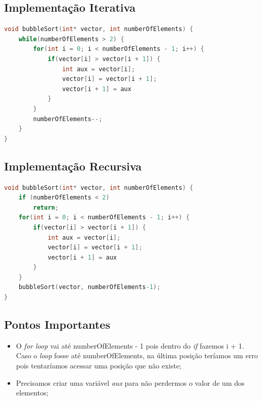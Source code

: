 \subsection{Implementação Iterativa}
\begin{lstlisting}[language=C]
void bubbleSort(int* vector, int numberOfElements) {
    while(numberOfElements > 2) {
        for(int i = 0; i < numberOfElements - 1; i++) {
            if(vector[i] > vector[i + 1]) {
                int aux = vector[i];
                vector[i] = vector[i + 1];
                vector[i + 1] = aux
            }
        }
        numberOfElements--;
    }
}
\end{lstlisting}

\subsection{Implementação Recursiva}
\begin{lstlisting}[language=C]
void bubbleSort(int* vector, int numberOfElements) {
    if (numberOfElements < 2)
        return;
    for(int i = 0; i < numberOfElements - 1; i++) {
        if(vector[i] > vector[i + 1]) {
            int aux = vector[i];
            vector[i] = vector[i + 1];
            vector[i + 1] = aux
        }
    }
    bubbleSort(vector, numberOfElements-1);
}
\end{lstlisting}

\subsection{Pontos Importantes}
\begin{itemize}
    \item O \textit{for loop} vai até numberOfElements - 1 pois dentro do \textit{if} fazemos i + 1. Caso o \textit{loop} fosse até numberOfElements, na última posição teríamos um erro pois tentaríamos acessar uma posição que não existe; 
    
    \item Precisamos criar uma variável \textit{aux} para não perdermos o valor de um dos elementos;
\end{itemize}
